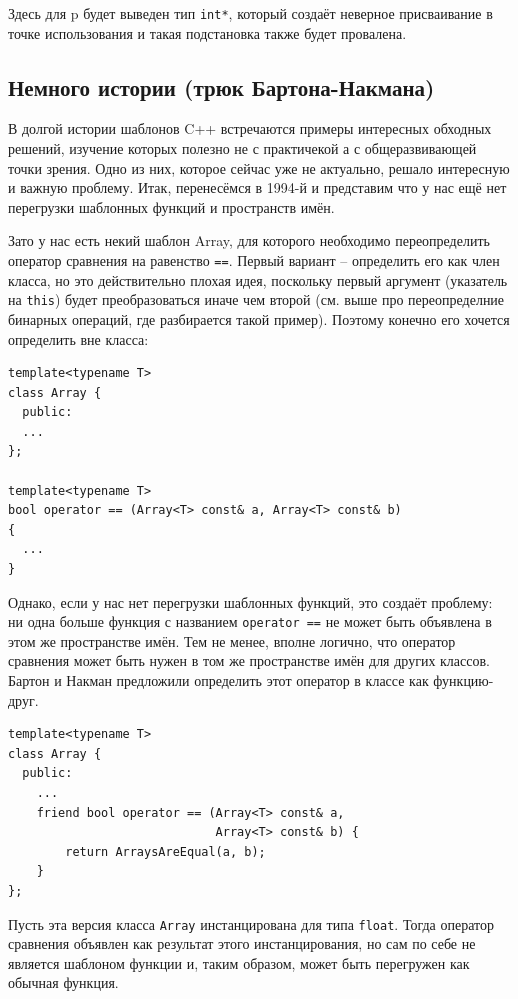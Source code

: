 \documentclass[a4paper,12pt,oneside]{article}
\begin{document}
Здесь для p будет выведен тип \lstinline!int*!, который создаёт неверное присваивание в точке использования и такая подстановка также будет провалена.

\subsection{Немного истории (трюк Бартона-Накмана)}

В долгой истории шаблонов C++ встречаются примеры интересных обходных решений, изучение которых полезно не с практичекой а с общеразвивающей точки зрения. Одно из них, которое сейчас уже не актуально, решало интересную и важную проблему. Итак, перенесёмся в 1994-й и представим что у нас ещё нет перегрузки шаблонных функций и пространств имён.

Зато у нас есть некий шаблон Array, для которого необходимо переопределить оператор сравнения на равенство \lstinline!==!. Первый вариант -- определить его как член класса, но это действительно плохая идея, поскольку первый аргумент (указатель на \lstinline!this!) будет преобразоваться иначе чем второй (см. выше про переопределние бинарных операций, где разбирается такой пример). Поэтому конечно его хочется определить вне класса:

\begin{lstlisting}
template<typename T> 
class Array { 
  public: 
  ...
}; 

template<typename T> 
bool operator == (Array<T> const& a, Array<T> const& b) 
{ 
  ... 
} 
\end{lstlisting}

Однако, если у нас нет перегрузки шаблонных функций, это создаёт проблему: ни одна больше функция с названием \lstinline!operator ==! не может быть объявлена в этом же пространстве имён. Тем не менее, вполне логично, что оператор сравнения может быть нужен в том же пространстве имён для других классов. Бартон и Накман предложили определить этот оператор в классе как функцию-друг.

\begin{lstlisting}
template<typename T> 
class Array { 
  public: 
    ... 
    friend bool operator == (Array<T> const& a, 
                             Array<T> const& b) { 
        return ArraysAreEqual(a, b); 
    } 
}; 
\end{lstlisting}

Пусть эта версия класса \lstinline!Array! инстанцирована для типа \lstinline!float!. Тогда оператор сравнения объявлен как результат этого инстанцирования, но сам по себе не является шаблоном функции и, таким образом, может быть перегружен как обычная функция.
\end{document}
